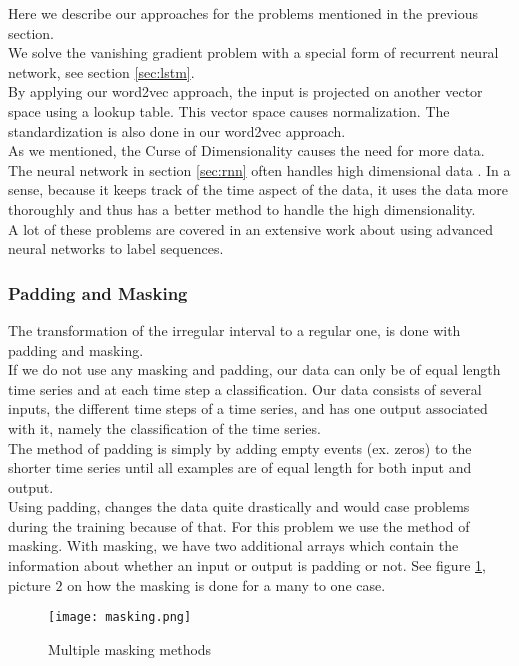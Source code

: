 Here we describe our approaches for the problems mentioned in the previous section. \\
We solve the vanishing gradient problem with a special form of recurrent neural network, see section \ref{sec:lstm}. \\
By applying our word2vec approach, the input is projected on another vector space using a lookup table. This vector space causes normalization. The standardization is also done in our word2vec approach. \\
As we mentioned, the Curse of Dimensionality causes the need for more data. The neural network in section \ref{sec:rnn} often handles high dimensional data \cite{nn1:article} \cite{nn2:article} \cite{nn3:article} \cite{nn4:article}. In a sense, because it keeps track of the time aspect of the data, it uses the data more thoroughly and thus has a better method to handle the high dimensionality. \\

A lot of these problems are covered in an extensive work \cite{gravesLstm:thesis} about using advanced neural networks to label sequences.

\subsubsection{Padding and Masking}
The transformation of the irregular interval to a regular one, is done with padding and masking. \\

If we do not use any masking and padding, our data can only be of equal length time series and at each time step a classification. Our data consists of several inputs, the different time steps of a time series, and has one output associated with it, namely the classification of the time series. \\

The method of padding is simply by adding empty events (ex. zeros) to the shorter time series until all examples are of equal length for both input and output. \\
Using padding, changes the data quite drastically and would case problems during the training because of that. For this problem we use the method of masking. With masking, we have two additional arrays which contain the information about whether an input or output is padding or not. See figure \ref{fig:masking}, picture $2$ on how the masking is done for a many to one case.

\begin{figure}[H]
	\centering
	\texttt{[image: masking.png]}
	\caption{Multiple masking methods \cite{dl4jRnn:online}}
	\label{fig:masking}
\end{figure} 


